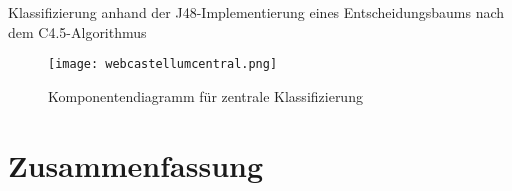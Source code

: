 Klassifizierung anhand der J48-Implementierung eines Entscheidungsbaums nach dem C4.5-Algorithmus

\begin{figure}[h]
    \centering
    \texttt{[image: webcastellumcentral.png]}
    \caption{Komponentendiagramm für zentrale Klassifizierung}
    \label{fig:my_future}
\end{figure}



\section{Zusammenfassung}

